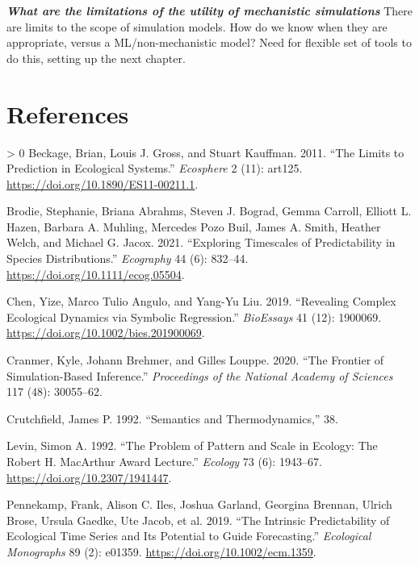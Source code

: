 \documentclass[11pt]{article}
\newlength{\cslhangindent}
\newenvironment{CSLReferences}[3] %
 {%
  \setlength{\parindent}{0pt}
  \ifodd #1 \everypar{\setlength{\hangindent}{\cslhangindent}}\ignorespaces\fi
  \ifnum #2 > 0
  \setlength{\parskip}{#2\baselineskip}
  \fi
 }%
 {}
\begin{document}
\textbf{\emph{What are the limitations of the utility of mechanistic
simulations}} There are limits to the scope of simulation models. How do
we know when they are appropriate, versus a ML/non-mechanistic model?
Need for flexible set of tools to do this, setting up the next chapter.

\hypertarget{references}{%
\section*{References}\label{references}}

\hypertarget{refs}{}
\begin{CSLReferences}{1}{0}
\leavevmode\hypertarget{ref-Beckage2011LimPre}{}%
Beckage, Brian, Louis J. Gross, and Stuart Kauffman. 2011. {``The Limits
to Prediction in Ecological Systems.''} \emph{Ecosphere} 2 (11): art125.
\url{https://doi.org/10.1890/ES11-00211.1}.

\leavevmode\hypertarget{ref-Brodie2021ExpTim}{}%
Brodie, Stephanie, Briana Abrahms, Steven J. Bograd, Gemma Carroll,
Elliott L. Hazen, Barbara A. Muhling, Mercedes Pozo Buil, James A.
Smith, Heather Welch, and Michael G. Jacox. 2021. {``Exploring
Timescales of Predictability in Species Distributions.''}
\emph{Ecography} 44 (6): 832--44.
\url{https://doi.org/10.1111/ecog.05504}.

\leavevmode\hypertarget{ref-Chen2019RevCom}{}%
Chen, Yize, Marco Tulio Angulo, and Yang-Yu Liu. 2019. {``Revealing
Complex Ecological Dynamics via Symbolic Regression.''} \emph{BioEssays}
41 (12): 1900069. \url{https://doi.org/10.1002/bies.201900069}.

\leavevmode\hypertarget{ref-Cranmer2020FroSim}{}%
Cranmer, Kyle, Johann Brehmer, and Gilles Louppe. 2020. {``The Frontier
of Simulation-Based Inference.''} \emph{Proceedings of the National
Academy of Sciences} 117 (48): 30055--62.

\leavevmode\hypertarget{ref-Crutchfield1992SemThe}{}%
Crutchfield, James P. 1992. {``Semantics and Thermodynamics,''} 38.

\leavevmode\hypertarget{ref-Levin1992ProPat}{}%
Levin, Simon A. 1992. {``The Problem of Pattern and Scale in Ecology:
The Robert H. MacArthur Award Lecture.''} \emph{Ecology} 73 (6):
1943--67. \url{https://doi.org/10.2307/1941447}.

\leavevmode\hypertarget{ref-Pennekamp2019IntPre}{}%
Pennekamp, Frank, Alison C. Iles, Joshua Garland, Georgina Brennan,
Ulrich Brose, Ursula Gaedke, Ute Jacob, et al. 2019. {``The Intrinsic
Predictability of Ecological Time Series and Its Potential to Guide
Forecasting.''} \emph{Ecological Monographs} 89 (2): e01359.
\url{https://doi.org/10.1002/ecm.1359}.


\end{CSLReferences}
\end{document}
